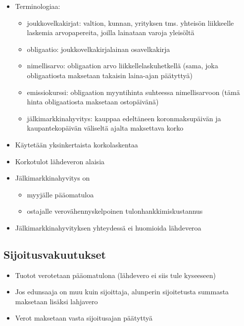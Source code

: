 \documentclass{article}
\begin{document}
\begin{itemize}
\itemsep1pt\parskip0pt
\item
  Terminologiaa:

  \begin{itemize}
    \itemsep1pt\parskip0pt
    \item
      joukkovelkakirjat: valtion, kunnan, yrityksen tms. yhteisön liikkeelle laskemia arvopapereita, joilla lainataan varoja yleisöltä 
    \item obligaatio: joukkovelkakirjalainan osavelkakirja
    \item
      nimellisarvo: obligaation arvo liikkellelaskuhetkellä (sama, joka
      obligaatiosta maksetaan takaisin laina-ajan päätyttyä)
    \item
      emissiokurssi: obligaation myyntihinta suhteessa nimellisarvoon
      (tämä hinta obligaatiosta maksetaan ostopäivänä)
    \item
      jälkimarkkinahyvitys: kauppaa edeltäneen koronmaksupäivän ja
      kaupantekopäivän väliseltä ajalta maksettava korko
  \end{itemize}
\item
  Käytetään yksinkertaista korkolaskentaa
\item
  Korkotulot lähdeveron alaisia
\item
  Jälkimarkkinahyvitys on 
  \begin{itemize}
    \item 
      myyjälle pääomatuloa
    \item 
      ostajalle verovähennyskelpoinen tulonhankkimiskustannus
  \end{itemize}
\item
  Jälkimarkkinahyvityksen yhteydessä ei huomioida lähdeveroa
\end{itemize}

\subsection{Sijoitusvakuutukset}\label{sijoitusvakuutukset}

\begin{itemize}
\itemsep1pt\parskip0pt
\item
  Tuotot verotetaan pääomatulona (lähdevero ei siis tule kyseeseen)
\item
  Jos edunsaaja on muu kuin sijoittaja, alunperin sijoitetusta summasta
  maksetaan lisäksi lahjavero
\item
  Verot maksetaan vasta sijoitusajan päätyttyä
\end{itemize}
\end{document}
